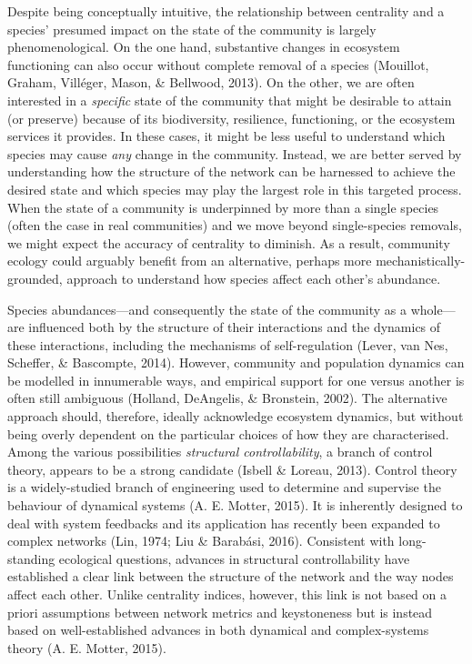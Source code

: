 \documentclass[a4paper]{artikel1}
\theoremstyle{definition}
\theoremstyle{definition}
\theoremstyle{definition}
\theoremstyle{remark}
\begin{document}
Despite being conceptually intuitive, the relationship between
centrality and a species' presumed impact on the state of the community
is largely phenomenological. On the one hand, substantive changes in
ecosystem functioning can also occur without complete removal of a
species (Mouillot, Graham, Villéger, Mason, \& Bellwood, 2013). On the
other, we are often interested in a \emph{specific} state of the
community that might be desirable to attain (or preserve) because of its
biodiversity, resilience, functioning, or the ecosystem services it
provides. In these cases, it might be less useful to understand which
species may cause \emph{any} change in the community. Instead, we are
better served by understanding how the structure of the network can be
harnessed to achieve the desired state and which species may play the
largest role in this targeted process. When the state of a community is
underpinned by more than a single species (often the case in real
communities) and we move beyond single-species removals, we might expect
the accuracy of centrality to diminish. As a result, community ecology
could arguably benefit from an alternative, perhaps more
mechanistically-grounded, approach to understand how species affect each
other's abundance.

Species abundances---and consequently the state of the community as a
whole---are influenced both by the structure of their interactions and
the dynamics of these interactions, including the mechanisms of
self-regulation (Lever, van Nes, Scheffer, \& Bascompte, 2014). However,
community and population dynamics can be modelled in innumerable ways,
and empirical support for one versus another is often still ambiguous
(Holland, DeAngelis, \& Bronstein, 2002). The alternative approach
should, therefore, ideally acknowledge ecosystem dynamics, but without
being overly dependent on the particular choices of how they are
characterised. Among the various possibilities \emph{structural
controllability}, a branch of control theory, appears to be a strong
candidate (Isbell \& Loreau, 2013). Control theory is a widely-studied
branch of engineering used to determine and supervise the behaviour of
dynamical systems (A. E. Motter, 2015). It is inherently designed to
deal with system feedbacks and its application has recently been
expanded to complex networks (Lin, 1974; Liu \& Barabási, 2016).
Consistent with long-standing ecological questions, advances in
structural controllability have established a clear link between the
structure of the network and the way nodes affect each other. Unlike
centrality indices, however, this link is not based on a priori
assumptions between network metrics and keystoneness but is instead
based on well-established advances in both dynamical and complex-systems
theory (A. E. Motter, 2015).
\end{document}
